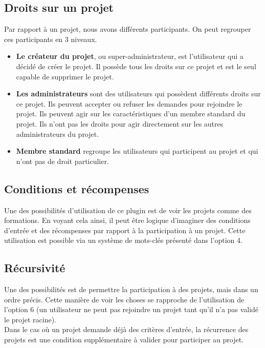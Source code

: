 \subsection{Droits sur un projet}

Par rapport à un projet, nous avons différents participants. On peut regrouper ces participants en 3 niveaux.
\begin{itemize}
    \item \textbf{Le créateur du projet}, ou super-administrateur, est l'utilisateur qui a décidé de créer le projet. Il possède tous les droits sur ce projet et est le seul capable de supprimer le projet.
    \item \textbf{Les administrateurs} sont des utilisateurs qui possèdent différents droits sur ce projet. Ils peuvent accepter ou refuser les demandes pour rejoindre le projet. Ils peuvent agir sur les caractéristiques d'un membre standard du projet. Ils n'ont pas les droits pour agir directement sur les autres administrateurs du projet.
    \item \textbf{Membre standard} regroupe les utilisateurs qui participent au projet et qui n'ont pas de droit particulier.
\end{itemize}


\subsection{Conditions et récompenses}

Une des possibilités d'utilisation de ce plugin est de voir les projets comme des formations. En voyant cela ainsi, il peut être logique d'imaginer des conditions d'entrée et des récompenses par rapport à la participation à un projet. Cette utilisation est possible via un système de mots-clés présenté dans l'option 4.

\subsection{Récursivité}

Une des possibilités est de permettre la participation à des projets, mais dans un ordre précis. Cette manière de voir les choses se rapproche de l'utilisation de l'option 6 (un utilisateur ne peut pas rejoindre un projet tant qu'il n'a pas validé le projet racine).\\
\newline
Dans le cas où un projet demande déjà des critères d'entrée, la récurrence des projets est une condition supplémentaire à valider pour participer au projet.
